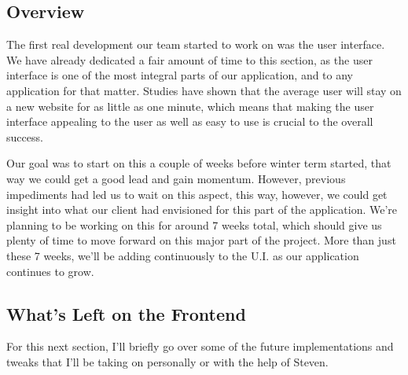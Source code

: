 \documentclass[onecolumn, draftclsnofoot,10pt, compsoc]{IEEEtran}
\begin{document}
\subsection{Overview}
The first real development our team started to work on was the user interface. We have already 
dedicated a fair amount of time to this section, as the user interface is one of the most 
integral parts of our application, and to any application for that matter. Studies have shown 
that the average user will stay on a new website for as little as one minute, which means 
that making the user interface appealing to the user as well as easy to use is crucial to the 
overall success.

Our goal was to start on this a couple of weeks before winter term started, that way we could 
get a good lead and gain momentum. However, previous impediments had led us to wait on this 
aspect, this way, however, we could get insight into what our client had envisioned for this 
part of the application. We’re planning to be working on this for around 7 weeks total, which 
should give us plenty of time to move forward on this major part of the project. More than 
just these 7 weeks, we’ll be adding continuously to the U.I. as our application continues to 
grow.

\subsection{What's Left on the Frontend}

For this next section, I'll briefly go over some of the future implementations and tweaks that
I'll be taking on personally or with the help of Steven.
\end{document}
